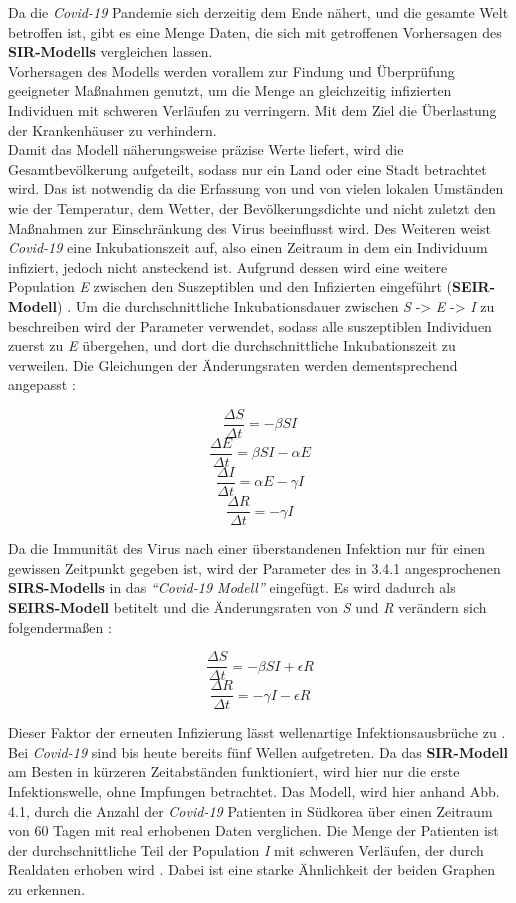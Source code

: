 \documentclass[12pt]{scrartcl} %
\begin{document}
Da die \textsl{Covid-19} Pandemie sich derzeitig dem Ende nähert, und die gesamte Welt betroffen ist, gibt es eine Menge Daten, die sich mit getroffenen Vorhersagen des \textbf{SIR-Modells} vergleichen lassen.\\
Vorhersagen des Modells werden vorallem zur Findung und Überprüfung geeigneter Maßnahmen genutzt, um die Menge an gleichzeitig infizierten Individuen mit schweren Verläufen zu verringern. Mit dem Ziel die Überlastung der Krankenhäuser zu verhindern.\\
Damit das Modell näherungsweise präzise Werte liefert, wird die Gesamtbevölkerung aufgeteilt, sodass nur ein Land oder eine Stadt betrachtet wird. Das ist notwendig da die Erfassung von \textbeta\space und \textgamma\space von vielen lokalen Umständen wie der Temperatur, dem Wetter, der Bevölkerungsdichte und nicht zuletzt den Maßnahmen zur Einschränkung des Virus beeinflusst wird. 
Des Weiteren weist \textsl{Covid-19} eine Inkubationszeit auf, also einen Zeitraum in dem ein Individuum infiziert, jedoch nicht ansteckend ist. Aufgrund dessen wird eine weitere Population \textit{E} zwischen den Suszeptiblen und den Infizierten eingeführt (\textbf{SEIR-Modell}) \cite{11, 3}. Um die durchschnittliche Inkubationsdauer zwischen \textit{S} -> \textit{E} -> \textit{I} zu beschreiben wird der Parameter \textalpha\space verwendet, sodass alle suszeptiblen Individuen zuerst zu \textit{E} übergehen, und dort die durchschnittliche Inkubationszeit zu verweilen. Die Gleichungen der Änderungsraten werden dementsprechend angepasst \cite{2, 3}:

$$ \frac{\Delta S}{\Delta t} = -\beta S I $$
$$ \frac{\Delta E}{\Delta t} = \beta S I - \alpha E$$
$$ \frac{\Delta I}{\Delta t} = \alpha E - \gamma I $$
$$ \frac{\Delta R}{\Delta t} = -\gamma I $$

Da die Immunität des Virus nach einer überstandenen Infektion nur für einen gewissen Zeitpunkt gegeben ist, wird der Parameter \textepsilon\space des in 3.4.1 angesprochenen \textbf{SIRS-Modells} in das \textsl{"`Covid-19 Modell"'} eingefügt. Es wird dadurch als \textbf{SEIRS-Modell} betitelt und die Änderungsraten von \textsl{S} und \textit{R} verändern sich folgendermaßen \cite{8}:

$$ \frac{\Delta S}{\Delta t} = -\beta S I + \epsilon R$$
$$ \frac{\Delta R}{\Delta t} = -\gamma I - \epsilon R$$

Dieser Faktor der erneuten Infizierung lässt wellenartige Infektionsausbrüche zu \cite{3}. Bei \textsl{Covid-19} sind bis heute bereits fünf Wellen aufgetreten. Da das \textbf{SIR-Modell} am Besten in kürzeren Zeitabständen funktioniert, wird hier nur die erste Infektionswelle, ohne Impfungen betrachtet. Das Modell, wird hier anhand Abb. 4.1, durch die Anzahl der \textsl{Covid-19} Patienten in Südkorea über einen Zeitraum von 60 Tagen mit real erhobenen Daten verglichen.
Die Menge der Patienten ist der durchschnittliche Teil der Population \textit{I} mit schweren Verläufen, der durch Realdaten erhoben wird \cite{3}. Dabei ist eine starke Ähnlichkeit der beiden Graphen zu erkennen.
\end{document}
